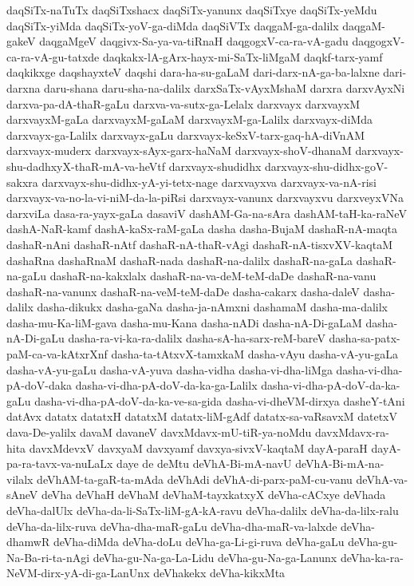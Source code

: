 {daqSiTx-naTuTx
daqSiTxshacx
daqSiTx-yanunx
daqSiTxye
daqSiTx-yeMdu
daqSiTx-yiMda
daqSiTx-yoV-ga-diMda
daqSiVTx
daqgaM-ga-dalilx
daqgaM-gakeV
daqgaMgeV
daqgivx-Sa-ya-va-tiRnaH
daqgogxV-ca-ra-vA-gadu
daqgogxV-ca-ra-vA-gu-tatxde
daqkakx-lA-gArx-hayx-mi-SaTx-liMgaM
daqkf-tarx-yamf
daqkikxge
daqshayxteV
daqshi
dara-ha-su-gaLaM
dari-darx-nA-ga-ba-lalxne
dari-darxna
daru-shana
daru-sha-na-dalilx
darxSaTx-vAyxMshaM
darxra
darxvAyxNi
darxva-pa-dA-thaR-gaLu
darxva-va-sutx-ga-Lelalx
darxvayx
darxvayxM
darxvayxM-gaLa
darxvayxM-gaLaM
darxvayxM-ga-Lalilx
darxvayx-diMda
darxvayx-ga-Lalilx
darxvayx-gaLu
darxvayx-keSxV-tarx-gaq-hA-diVnAM
darxvayx-muderx
darxvayx-sAyx-garx-haNaM
darxvayx-shoV-dhanaM
darxvayx-shu-dadhxyX-thaR-mA-va-heVtf
darxvayx-shudidhx
darxvayx-shu-didhx-goV-sakxra
darxvayx-shu-didhx-yA-yi-tetx-nage
darxvayxva
darxvayx-va-nA-risi
darxvayx-va-no-la-vi-niM-da-la-piRsi
darxvayx-vanunx
darxvayxvu
darxveyxVNa
darxviLa
dasa-ra-yayx-gaLa
dasaviV
dashAM-Ga-na-sAra
dashAM-taH-ka-raNeV
dashA-NaR-kamf
dashA-kaSx-raM-gaLa
dasha
dasha-BujaM
dashaR-nA-maqta
dashaR-nAni
dashaR-nAtf
dashaR-nA-thaR-vAgi
dashaR-nA-tisxvXV-kaqtaM
dashaRna
dashaRnaM
dashaR-nada
dashaR-na-dalilx
dashaR-na-gaLa
dashaR-na-gaLu
dashaR-na-kakxlalx
dashaR-na-va-deM-teM-daDe
dashaR-na-vanu
dashaR-na-vanunx
dashaR-na-veM-teM-daDe
dasha-cakarx
dasha-daleV
dasha-dalilx
dasha-dikukx
dasha-gaNa
dasha-ja-nAmxni
dashamaM
dasha-ma-dalilx
dasha-mu-Ka-liM-gava
dasha-mu-Kana
dasha-nADi
dasha-nA-Di-gaLaM
dasha-nA-Di-gaLu
dasha-ra-vi-ka-ra-dalilx
dasha-sA-ha-sarx-reM-bareV
dasha-sa-patx-paM-ca-va-kAtxrXnf
dasha-ta-tAtxvX-tamxkaM
dasha-vAyu
dasha-vA-yu-gaLa
dasha-vA-yu-gaLu
dasha-vA-yuva
dasha-vidha
dasha-vi-dha-liMga
dasha-vi-dha-pA-doV-daka
dasha-vi-dha-pA-doV-da-ka-ga-Lalilx
dasha-vi-dha-pA-doV-da-ka-gaLu
dasha-vi-dha-pA-doV-da-ka-ve-sa-gida
dasha-vi-dheVM-dirxya
dasheY-tAni
datAvx
datatx
datatxH
datatxM
datatx-liM-gAdf
datatx-sa-vaRsavxM
datetxV
dava-De-yalilx
davaM
davaneV
davxMdavx-mU-tiR-ya-noMdu
davxMdavx-ra-hita
davxMdevxV
davxyaM
davxyamf
davxya-sivxV-kaqtaM
dayA-paraH
dayA-pa-ra-tavx-va-nuLaLx
daye
de
deMtu
deVhA-Bi-mA-navU
deVhA-Bi-mA-na-vilalx
deVhAM-ta-gaR-ta-mAda
deVhAdi
deVhA-di-parx-paM-cu-vanu
deVhA-va-sAneV
deVha
deVhaH
deVhaM
deVhaM-tayxkatxyX
deVha-cACxye
deVhada
deVha-dalUlx
deVha-da-li-SaTx-liM-gA-kA-ravu
deVha-dalilx
deVha-da-lilx-ralu
deVha-da-lilx-ruva
deVha-dha-maR-gaLu
deVha-dha-maR-va-lalxde
deVha-dhamwR
deVha-diMda
deVha-doLu
deVha-ga-Li-gi-ruva
deVha-gaLu
deVha-gu-Na-Ba-ri-ta-nAgi
deVha-gu-Na-ga-La-Lidu
deVha-gu-Na-ga-Lanunx
deVha-ka-ra-NeVM-dirx-yA-di-ga-LanUnx
deVhakekx
deVha-kikxMta
}
